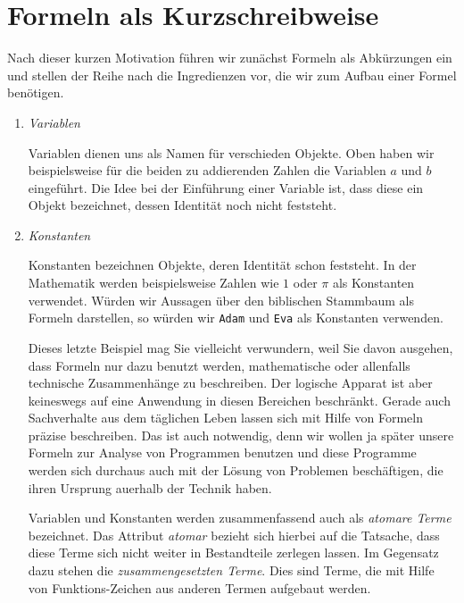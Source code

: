 \section{Formeln als Kurzschreibweise}
Nach dieser kurzen Motivation f\"uhren wir zun\"achst Formeln als Abk\"urzungen ein und stellen
der Reihe nach die Ingredienzen vor, die wir zum Aufbau einer Formel ben\"otigen. 
\begin{enumerate}
\item \emph{Variablen}

      Variablen dienen uns als Namen f\"ur verschieden Objekte.  Oben haben wir beispielsweise 
      f\"ur die beiden zu addierenden Zahlen die Variablen $a$ und $b$ eingef\"uhrt.  Die Idee bei
      der Einf\"uhrung einer Variable ist, dass diese ein Objekt bezeichnet, dessen Identit\"at 
      noch nicht feststeht.
\item \emph{Konstanten}

      Konstanten bezeichnen  Objekte, deren Identit\"at schon feststeht. 
      In der Mathematik werden beispielsweise Zahlen wie $1$ oder $\pi$ als Konstanten verwendet.
      W\"urden wir Aussagen \"uber den biblischen Stammbaum als Formeln darstellen, so w\"urden
      wir  \texttt{Adam} und \texttt{Eva} als Konstanten verwenden.

      \begin{center}
      \begin{minipage}{13.4cm}  
        { \footnotesize
          \setlength{\baselineskip}{9pt} 
          Dieses letzte Beispiel mag Sie vielleicht verwundern, weil Sie davon
          ausgehen, dass Formeln nur dazu benutzt werden, mathematische oder allenfalls
          technische Zusammenh\"ange zu beschreiben.  Der logische Apparat ist aber
          keineswegs auf eine Anwendung in diesen Bereichen beschr\"ankt.  Gerade auch
          Sachverhalte aus dem t\"aglichen Leben lassen sich mit Hilfe von Formeln pr\"azise
          beschreiben.  Das ist auch notwendig, denn wir wollen ja sp\"ater unsere Formeln
          zur Analyse von Programmen benutzen und diese Programme werden sich durchaus
          auch mit der L\"osung von Problemen besch\"aftigen, die ihren Ursprung au\3erhalb der
          Technik haben. \par} 
      \end{minipage}
      \end{center}

      Variablen und Konstanten werden zusammenfassend auch als \emph{atomare Terme}
      bezeichnet.  Das Attribut \emph{atomar} bezieht sich hierbei auf die Tatsache,
      dass diese Terme sich nicht weiter in Bestandteile zerlegen lassen.  Im Gegensatz
      dazu stehen die \emph{zusammengesetzten Terme}.  Dies sind Terme, die mit Hilfe von 
      Funktions-Zeichen aus anderen Termen aufgebaut werden.


\end{enumerate}
